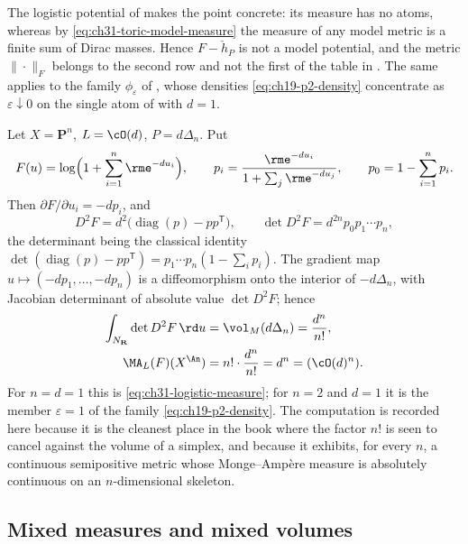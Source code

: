 The logistic potential of  makes the point
concrete: its measure has no atoms, whereas by
\eqref{eq:ch31-toric-model-measure} the measure of any model metric is a
finite sum of Dirac masses.  Hence $F-\check h_P$ is not a model potential, and the
metric $\|\cdot\|_F$ belongs to the second row and not the first of the
table in .  The same applies to the family
$\phi_\varepsilon$ of , whose densities
\eqref{eq:ch19-p2-density} concentrate as $\varepsilon\downarrow0$ on the
single atom of  with $d=1$.

\begin{example}
\label{ex:ch31-toric-logsumexp}
Let $X=\mathbf P^n$, $L=\cO(d)$, $P=d\Delta_n$.  Put
\[
 F(u)=\log\Bigl(1+\sum_{i=1}^n\rme^{-du_i}\Bigr),
 \qquad
 p_i=\frac{\rme^{-du_i}}{1+\sum_j\rme^{-du_j}},
 \qquad
 p_0=1-\sum_{i=1}^np_i .
\]
Then $\partial F/\partial u_i=-dp_i$, and
\[
 D^2F=d^2\bigl(\operatorname{diag}(p)-pp^{\mathsf T}\bigr),
 \qquad
 \det D^2F=d^{2n}p_0p_1\cdots p_n ,
\]
the determinant being the classical identity
$\det(\operatorname{diag}(p)-pp^{\mathsf T})=p_1\cdots p_n(1-\sum_ip_i)$.
The gradient map $u\mapsto(-dp_1,\ldots,-dp_n)$ is a diffeomorphism onto
the interior of $-d\Delta_n$, with Jacobian determinant of absolute value
$\det D^2F$; hence
\begin{equation}
\label{eq:ch31-logsumexp-mass}
 \begin{aligned}
 \int_{N_\mathbf R}\det D^2F\,\rd u
   &=\vol_M(d\Delta_n)=\frac{d^n}{n!},\\
 \MA_L(F)(X^{\An})
   &=n!\cdot\frac{d^n}{n!}=d^n=(\cO(d)^n).
 \end{aligned}
\end{equation}
For $n=d=1$ this is \eqref{eq:ch31-logistic-measure}; for $n=2$ and
$d=1$ it is the member $\varepsilon=1$ of the family
\eqref{eq:ch19-p2-density}.  The computation is recorded here because it is
the cleanest place in the book where the factor $n!$ is seen to cancel
against the volume of a simplex, and because it exhibits, for every $n$,
a continuous semipositive metric whose Monge--Amp\`ere measure is
absolutely continuous on an $n$-dimensional skeleton.
\end{example}

\subsection{Mixed measures and mixed volumes}
\label{sec:ch31-toric-mixed}

